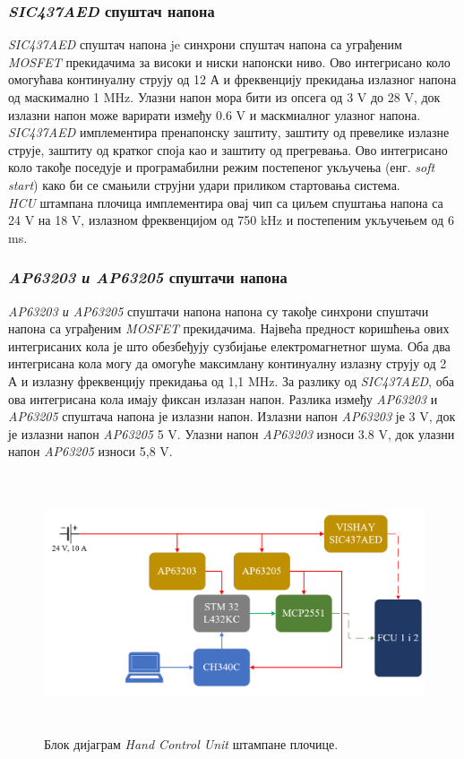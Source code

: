 \documentclass{article}
\begin{document}
\subsubsection{\textit{SIC437AED} спуштач напона}
\textit{SIC437AED} спуштач напона je синхрони спуштач напона са уграђеним \textit{MOSFET} \cite{mosfet} прекидачима 
за високи и ниски напонски ниво. Ово интегрисано коло омогућава континуалну струју од 12 А и фреквенцију прекидања 
излазног напона од маскимално 1 MHz. Улазни напон мора бити из опсега од 3 V до 28 V, док излазни напон може варирати 
између  0.6 V и маскмиалног улазног напона.\\
\textit{SIC437AED} имплементира пренапонску заштиту, заштиту од превелике излазне струје, заштиту од 
кратког споја као и заштиту од прегревања. Ово интегрисано коло такође поседује и програмабилни режим
постепеног укључења (енг. \textit{soft start}) како би се смањили струјни удари приликом стартовања система.\\
\textit{HCU} штампана плочица имплементира овај чип са циљем спуштања напона са 24 V на 
18 V, излазном фреквенцијом од 750 kHz и постепеним укључењем од 6 ms.

\subsubsection{\textit{AP63203 и AP63205} спуштачи напона}
\textit{AP63203 и AP63205} спуштачи напона напона су такође синхрони спуштачи напона са уграђеним \textit{MOSFET} прекидачима. Највећа предност коришћења ових 
интегрисаних кола је што обезбеђују сузбијање електромагнетног шума. Оба два интегрисана кола могу да омогуће максимлану континуалну излазну струју од 2 А и излазну фреквенцију прекидања од 1,1 MHz. За разлику од \textit{SIC437AED}, оба ова интегрисана кола имају фиксан излазан напон.
Разлика између \textit{AP63203} и \textit{AP63205} спуштача напона је излазни напон. Излазни напон \textit{AP63203} је 3 V, док је излазни напон \textit{AP63205} 5 V. Улазни напон \textit{AP63203} износи 
3.8 V, док улазни напон \textit{AP63205} износи 5,8 V.

\begin{figure}[H]
\centering
\includegraphics[height=3in]{Images/HCU_blok_sema.png}
\caption{Блок дијаграм \textit{Hand Control Unit} штампане плочице.}
\label{fig:figure9}
\end{figure}
\end{document}
